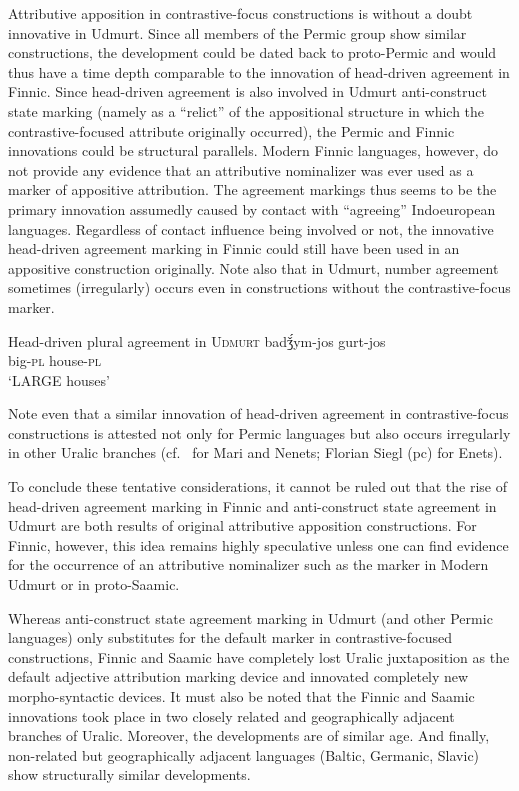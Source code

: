 {Attributive apposition in contrastive-focus constructions is without a doubt innovative in Udmurt. Since all members of the Permic group show similar constructions, the development could be dated back to proto-Permic and would thus have a time depth comparable to the innovation of head-driven agreement in Finnic. Since head-driven agreement is also involved in Udmurt anti-construct state marking (namely as a “relict” of the appositional structure in which the contrastive-focused attribute originally occurred), the Permic and Finnic innovations could be structural parallels. Modern Finnic languages, however, do not provide any evidence that an attributive nominalizer was ever used as a marker of appositive attribution. The agreement markings thus seems to be the primary innovation assumedly caused by contact with “agreeing” Indoeuropean languages. Regardless of contact influence being involved or not, the innovative head-driven agreement marking in Finnic could still have been used in an appositive construction originally. Note also that in Udmurt, number agreement sometimes (irregularly) occurs even in constructions without the contrastive-focus marker.
\begin{exe}
\ex Head-driven plural agreement in \textsc{Udmurt} \citep{winkler2001}
\gll	badǯ́ym-jos gurt-jos\\
	big-\textsc{pl} house-\textsc{pl}\\
\glt	‘LARGE houses’
\end{exe}
Note even that a similar innovation of head-driven agreement in contrastive-focus constructions is attested not only for Permic languages but also occurs irregularly in other Uralic branches (cf.~\citealt[136–138, 142]{honti1997} for Mari and Nenets; Florian Siegl (pc) for Enets).

To conclude these tentative considerations, it cannot be ruled out that the rise of head-driven agreement marking in Finnic and anti-construct state agreement in Udmurt are both results of original attributive apposition constructions. For Finnic, however, this idea remains highly speculative unless one can find evidence for the occurrence of an attributive nominalizer such as the marker in Modern Udmurt or in proto-Saamic. 

Whereas anti-construct state agreement marking in Udmurt (and other Permic languages) only substitutes for the default marker in contrastive-focused constructions, Finnic and Saamic have completely lost Uralic juxtaposition as the default adjective attribution marking device and innovated completely new morpho-syntactic devices. It must also be noted that the Finnic and Saamic innovations took place in two closely related and geographically adjacent branches of Uralic. Moreover, the developments are of similar age. And finally, non-related but geographically adjacent languages (Baltic, Germanic, Slavic) show structurally similar developments.

}
